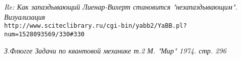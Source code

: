 \documentclass{article}
\begin{document}
\begin{thebibliography}{99}


\textit{Re: Как запаздывающий Лиенар-Вихерт становится "незапаздывающим". Визуализация}
\\\texttt{http://www.sciteclibrary.ru/cgi-bin/yabb2/YaBB.pl?num=1528093569/330\#330}


\textit{З.Флюгге Задачи по квантовой механике т.2 М. "Мир" 1974. стр. 296}






\end{thebibliography}
\end{document}
